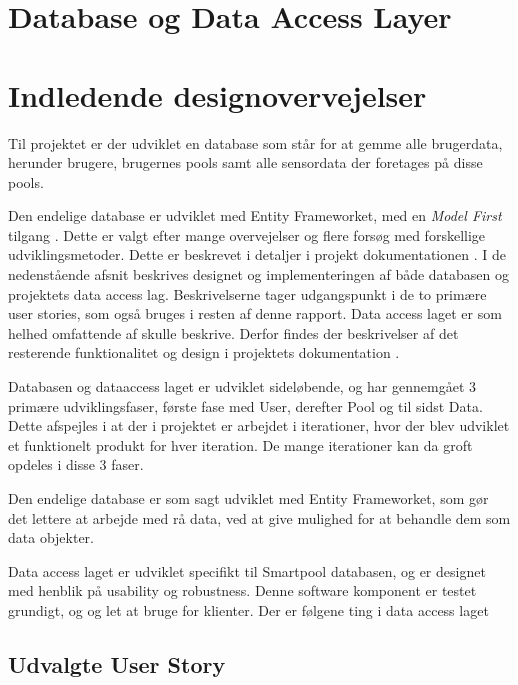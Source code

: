 \section{Database og Data Access Layer}\label{sec:designdatabase}

\section{Indledende designovervejelser}\label{sec:designdatabase}

Til projektet er der udviklet en database som står for at gemme alle brugerdata, herunder brugere, brugernes pools samt alle sensordata der foretages på disse pools.

Den endelige database er udviklet med Entity Frameworket, med en \textit{Model First} tilgang . Dette er valgt efter mange overvejelser og flere forsøg med forskellige udviklingsmetoder. Dette er beskrevet i detaljer i projekt dokumentationen . I de nedenstående afsnit beskrives designet og implementeringen af både databasen og projektets data access lag. Beskrivelserne tager udgangspunkt i de to primære user stories, som også bruges i resten af denne rapport. Data access laget er som helhed omfattende af skulle beskrive. Derfor findes der beskrivelser af det resterende funktionalitet og design i projektets dokumentation .

Databasen og dataaccess laget er udviklet sideløbende, og har gennemgået 3 primære udviklingsfaser, første fase med User, derefter Pool og til sidst Data. Dette afspejles i at der i projektet er arbejdet i iterationer, hvor der blev udviklet et funktionelt produkt for hver iteration. De mange iterationer kan da groft opdeles i disse 3 faser.

Den endelige database er som sagt udviklet med Entity Frameworket, som gør det lettere at arbejde med rå data, ved at give mulighed for at behandle dem som data objekter.

Data access laget er udviklet specifikt til Smartpool databasen, og er designet med henblik på usability og robustness. Denne software komponent er testet grundigt, og og let at bruge for klienter.
Der er følgene ting i data access laget 
\subsection{Udvalgte User Story}

